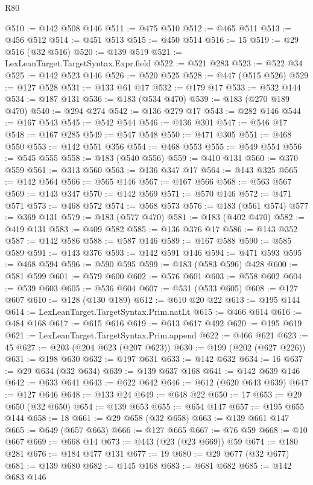 \begin{lexlean}{R80}
\begin{coremodule}
@510 := @142 @508 @146
@511 := @475 @510
@512 := @465 @511
@513 := @456 @512
@514 := @451 @513
@515 := @450 @514
@516 := 15
@519 := @29 @516 (@32 @516)
@520 := @139 @519
@521 := LexLeanTarget.TargetSyntax.Expr.field
@522 := @521 @283
@523 := @522 @34
@525 := @142 @523 @146
@526 := @520 @525
@528 := @447 (@515 @526)
@529 := @127 @528
@531 := @133 @61 @17
@532 := @179 @17
@533 := @532 @144
@534 := @187 @131
@536 := @183 (@534 @470)
@539 := @183 (@270 @189 @470)
@540 := @294 @274
@542 := @136 @279 @17
@543 := @282 @146
@544 := @167 @543
@545 := @542 @544
@546 := @136 @301
@547 := @546 @17
@548 := @167 @285
@549 := @547 @548
@550 := @471 @305
@551 := @468 @550
@553 := @142 @551 @356
@554 := @468 @553
@555 := @549 @554
@556 := @545 @555
@558 := @183 (@540 @556)
@559 := @410 @131
@560 := @370 @559
@561 := @313 @560
@563 := @136 @347 @17
@564 := @143 @325
@565 := @142 @564
@566 := @565 @146
@567 := @167 @566
@568 := @563 @567
@569 := @143 @347
@570 := @142 @569
@571 := @570 @146
@572 := @471 @571
@573 := @468 @572
@574 := @568 @573
@576 := @183 (@561 @574)
@577 := @369 @131
@579 := @183 (@577 @470)
@581 := @183 (@402 @470)
@582 := @419 @131
@583 := @409 @582
@585 := @136 @376 @17
@586 := @143 @352
@587 := @142 @586
@588 := @587 @146
@589 := @167 @588
@590 := @585 @589
@591 := @143 @376
@593 := @142 @591 @146
@594 := @471 @593
@595 := @468 @594
@596 := @590 @595
@599 := @183 (@583 @596) @428
@600 := @581 @599
@601 := @579 @600
@602 := @576 @601
@603 := @558 @602
@604 := @539 @603
@605 := @536 @604
@607 := @531 (@533 @605)
@608 := @127 @607
@610 := @128 (@130 @189)
@612 := @610 @20 @22
@613 := @195 @144
@614 := LexLeanTarget.TargetSyntax.Prim.natLt
@615 := @466 @614
@616 := @484 @168
@617 := @615 @616
@619 := @613 @617 @492
@620 := @195 @619
@621 := LexLeanTarget.TargetSyntax.Prim.append
@622 := @466 @621
@623 := 45
@627 := @203 (@204 @623 (@207 @623))
@630 := @199 (@202 (@627 @226))
@631 := @198 @630
@632 := @197 @631
@633 := @142 @632
@634 := 16
@637 := @29 @634 (@32 @634)
@639 := @139 @637 @168
@641 := @142 @639 @146
@642 := @633 @641
@643 := @622 @642
@646 := @612 (@620 @643 @639)
@647 := @127 @646
@648 := @133 @24
@649 := @648 @22
@650 := 17
@653 := @29 @650 (@32 @650)
@654 := @139 @653
@655 := @654 @147
@657 := @195 @655 @144
@658 := 18
@661 := @29 @658 (@32 @658)
@663 := @139 @661 @147
@665 := @649 (@657 @663)
@666 := @127 @665
@667 := @76 @59
@668 := @10 @667
@669 := @668 @14
@673 := @443 (@23 (@23 @669)) @59
@674 := @180 @281
@676 := @184 @477 @131
@677 := 19
@680 := @29 @677 (@32 @677)
@681 := @139 @680
@682 := @145 @168
@683 := @681 @682
@685 := @142 @683 @146

\end{coremodule}
\end{lexlean}
